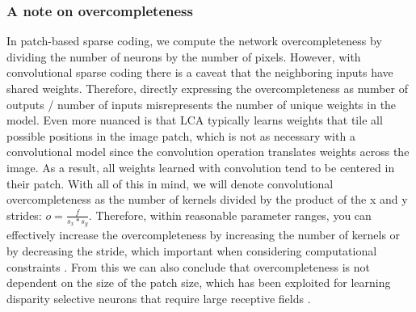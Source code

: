 \subsubsection{A note on overcompleteness}
In patch-based sparse coding, we compute the network overcompleteness by dividing the number of neurons by the number of pixels. However, with convolutional sparse coding there is a caveat that the neighboring inputs have shared weights. Therefore, directly expressing the overcompleteness as number of outputs / number of inputs misrepresents the number of unique weights in the model. Even more nuanced is that LCA typically learns weights that tile all possible positions in the image patch, which is not as necessary with a convolutional model since the convolution operation translates weights across the image. As a result, all weights learned with convolution tend to be centered in their patch. With all of this in mind, we will denote convolutional overcompleteness as the number of kernels divided by the product of the x and y strides: $o = \tfrac{f}{s_{x}*s_{y}}$. Therefore, within reasonable parameter ranges, you can effectively increase the overcompleteness by increasing the number of kernels or by decreasing the stride, which important when considering computational constraints \parencite{schultz2014replicating}. From this we can also conclude that overcompleteness is not dependent on the size of the patch size, which has been exploited for learning disparity selective neurons that require large receptive fields \parencite{lundquist2016sparse}.


